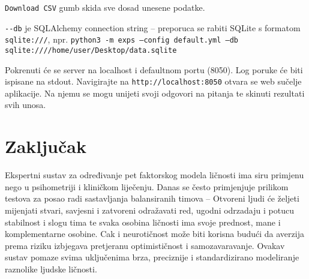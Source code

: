 \documentclass[times, utf8, seminar]{fer}
\begin{document}
\verb|Download CSV| gumb skida sve dosad unesene podatke.

\verb|--db| je SQLAlchemy connection string -- preporuca se rabiti SQLite s formatom \texttt{sqlite:///}, npr. \texttt{python3 -m exps --config default.yml --db sqlite:////home/user/Desktop/data.sqlite}

Pokrenuti će se server na localhost i defaultnom portu (8050). Log poruke će biti ispisane na stdout. Navigirajte na \verb|http://localhost:8050| otvara se web sučelje aplikacije. Na njemu se mogu unijeti svoji odgovori na pitanja te skinuti rezultati svih unosa.

\chapter{Zaključak}

Ekspertni sustav za određivanje pet faktorskog modela ličnosti ima siru primjenu nego u psihometriji i kliničkom liječenju. Danas se često primjenjuje prilikom testova za posao radi sastavljanja balansiranih timova -- Otvoreni ljudi će željeti mijenjati stvari, savjesni i zatvoreni odražavati red, ugodni odrzadaju i potucu stabilnost i slogu tima te svaka osobina ličnosti ima svoje prednost, mane i komplementarne osobine. Cak i neurotičnost može biti korisna budući da averzija prema riziku izbjegava pretjeranu optimističnost i samozavaravanje.
Ovakav sustav pomaze svima uključenima brza, preciznije i standardizirano modeliranje raznolike ljudske ličnosti.



\end{document}

